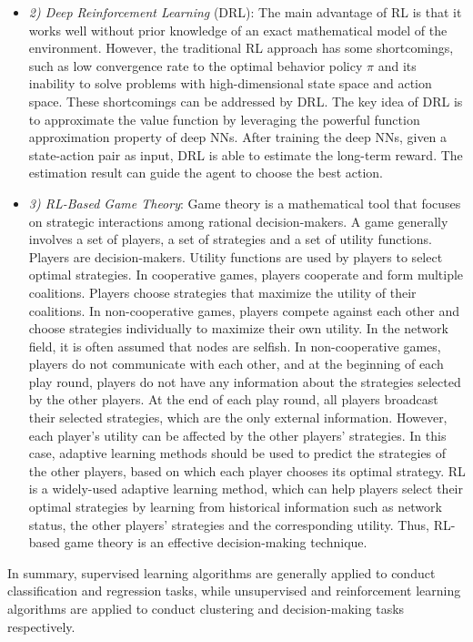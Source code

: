 \begin{itemize}
\begin{itemize}
\item[]\textit{2)	Deep Reinforcement Learning} (DRL): The main advantage of RL is that it works well without prior knowledge of an exact mathematical model of the environment. However, the traditional RL approach has some shortcomings, such as low convergence rate to the optimal behavior policy $\pi$ and its inability to solve problems with high-dimensional state space and action space. These shortcomings can be addressed by DRL. The key idea of DRL is to approximate the value function by leveraging the powerful function approximation property of deep NNs. After training the deep NNs, given a state-action pair as input, DRL is able to estimate the long-term reward. The estimation result can guide the agent to choose the best action.
\item[]\textit{3)	RL-Based Game Theory}: Game theory is a mathematical tool that focuses on strategic interactions among rational decision-makers. A game generally involves a set of players, a set of strategies and a set of utility functions. Players are decision-makers. Utility functions are used by players to select optimal strategies. In cooperative games, players cooperate and form multiple coalitions. Players choose strategies that maximize the utility of their coalitions. In non-cooperative games, players compete against each other and choose strategies individually to maximize their own utility. In the network field, it is often assumed that nodes are selfish.
In non-cooperative games, players do not communicate with each other, and at the beginning of each play round, players do not have any information about the strategies selected by the other players. At the end of each play round, all players broadcast their selected strategies, which are the only external information. However, each player’s utility can be affected by the other players’ strategies. In this case, adaptive learning methods should be used to predict the strategies of the other players, based on which each player chooses its optimal strategy. RL is a widely-used adaptive learning method, which can help players select their optimal strategies by learning from historical information such as network status, the other players’ strategies and the corresponding utility. Thus, RL-based game theory is an effective decision-making technique.
\end{itemize}
\end{itemize}
In summary, supervised learning algorithms are generally applied to conduct classification and regression tasks, while unsupervised and reinforcement learning algorithms are applied to conduct clustering and decision-making tasks respectively.


